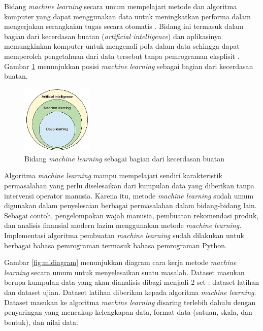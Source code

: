 Bidang \textit{machine learning} secara umum mempelajari metode dan algoritma
komputer yang dapat menggunakan data untuk meningkatkan performa dalam
mengerjakan serangkaian tugas secara otomatis \cite{mitchell1997}. Bidang ini
termasuk dalam bagian dari kecerdasan buatan (\textit{artificial intelligence})
dan aplikasinya memungkinkan komputer untuk mengenali pola dalam data sehingga
dapat memperoleh pengetahuan dari data tersebut tanpa pemrograman eksplisit
\cite{v2020}. Gambar \ref{fig:aiml} menunjukkan posisi \textit{machine learning}
sebagai bagian dari kecerdasan buatan.

\begin{figure}[H]
\setlength{}
\begin{center}
\includegraphics[width=0.3\textwidth]{fig/aiml.jpg}
	\caption[Bidang \textit{machine learning} sebagai bagian dari kecerdasan buatan]{Bidang \textit{machine learning} sebagai bagian dari kecerdasan buatan~\cite{2020}}
\label{fig:aiml}
\end{center}
\end{figure}

Algoritma \textit{machine learning} mampu mempelajari sendiri karakteristik
permasalahan yang perlu diselesaikan dari kumpulan data yang diberikan tanpa
intervensi operator manusia. Karena itu, metode \textit{machine learning} sudah
umum digunakan dalam penyelesaian berbagai permasalahan dalam bidang-bidang
lain. Sebagai contoh, pengelompokan wajah manusia, pembuatan rekomendasi
produk, dan analisis finansial modern lazim menggunakan metode \textit{machine
learning}. Implementasi algoritma pembuatan \textit{machine learning} sudah
dilakukan untuk berbagai bahasa pemrograman termasuk bahasa pemrograman Python.

Gambar \ref{fig:mldiagram} menunjukkan diagram cara kerja metode
\textit{machine learning} secara umum untuk menyelesaikan suatu masalah.
Dataset masukan berupa kumpulan data yang akan dianalisis dibagi menjadi 2 set
: dataset latihan dan dataset ujian. Dataset latihan diberikan kepada algoritma
\textit{machine learning}. Dataset masukan ke algoritma \textit{machine
learning} disaring terlebih dahulu dengan penyaringan yang mencakup kelengkapan
data, format data (satuan, skala, dan bentuk), dan nilai data.

